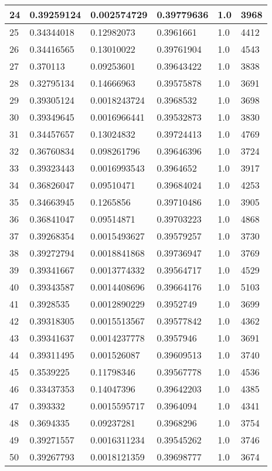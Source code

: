 \begin{longtable}{|l|l|l|l|l|l|}
24 & 0.39259124 & 0.002574729 & 0.39779636 & 1.0 & 3968 \\ \hline 
25 & 0.34344018 & 0.12982073 & 0.3961661 & 1.0 & 4412 \\ \hline 
26 & 0.34416565 & 0.13010022 & 0.39761904 & 1.0 & 4543 \\ \hline 
27 & 0.370113 & 0.09253601 & 0.39643422 & 1.0 & 3838 \\ \hline 
28 & 0.32795134 & 0.14666963 & 0.39575878 & 1.0 & 3691 \\ \hline 
29 & 0.39305124 & 0.0018243724 & 0.3968532 & 1.0 & 3698 \\ \hline 
30 & 0.39349645 & 0.0016966441 & 0.39532873 & 1.0 & 3830 \\ \hline 
31 & 0.34457657 & 0.13024832 & 0.39724413 & 1.0 & 4769 \\ \hline 
32 & 0.36760834 & 0.098261796 & 0.39646396 & 1.0 & 3724 \\ \hline 
33 & 0.39323443 & 0.0016993543 & 0.3964652 & 1.0 & 3917 \\ \hline 
34 & 0.36826047 & 0.09510471 & 0.39684024 & 1.0 & 4253 \\ \hline 
35 & 0.34663945 & 0.1265856 & 0.39710486 & 1.0 & 3905 \\ \hline 
36 & 0.36841047 & 0.09514871 & 0.39703223 & 1.0 & 4868 \\ \hline 
37 & 0.39268354 & 0.0015493627 & 0.39579257 & 1.0 & 3730 \\ \hline 
38 & 0.39272794 & 0.0018841868 & 0.39736947 & 1.0 & 3769 \\ \hline 
39 & 0.39341667 & 0.0013774332 & 0.39564717 & 1.0 & 4529 \\ \hline 
40 & 0.39343587 & 0.0014408696 & 0.39664176 & 1.0 & 5103 \\ \hline 
41 & 0.3928535 & 0.0012890229 & 0.3952749 & 1.0 & 3699 \\ \hline 
42 & 0.39318305 & 0.0015513567 & 0.39577842 & 1.0 & 4362 \\ \hline 
43 & 0.39341637 & 0.0014237778 & 0.3957946 & 1.0 & 3691 \\ \hline 
44 & 0.39311495 & 0.001526087 & 0.39609513 & 1.0 & 3740 \\ \hline 
45 & 0.3539225 & 0.11798346 & 0.39567778 & 1.0 & 4536 \\ \hline 
46 & 0.33437353 & 0.14047396 & 0.39642203 & 1.0 & 4385 \\ \hline 
47 & 0.393332 & 0.0015595717 & 0.3964094 & 1.0 & 4341 \\ \hline 
48 & 0.3694335 & 0.09237281 & 0.3968296 & 1.0 & 3754 \\ \hline 
49 & 0.39271557 & 0.0016311234 & 0.39545262 & 1.0 & 3746 \\ \hline 
50 & 0.39267793 & 0.0018121359 & 0.39698777 & 1.0 & 3674 \\ \hline 
\end{longtable}